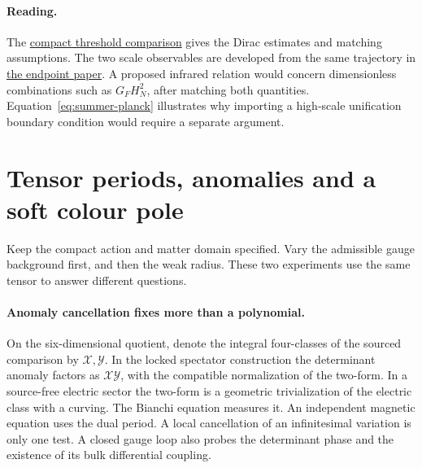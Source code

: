\documentclass[10pt]{article}
\theoremstyle{definition}
\begin{document}
\paragraph{Reading.} The \href{https://github.com/arivero/conneskk/blob/master/results/108_hopf_global_flux_and_anomaly_domain.md#colour-thresholds-at-the-compact-weak-fit}{compact threshold comparison} gives the Dirac estimates and matching assumptions. The two scale observables are developed from the same trajectory in \href{https://github.com/arivero/conneskk/blob/master/paper/two_endpoint_limits.tex}{the endpoint paper}. A proposed infrared relation would concern dimensionless combinations such as \(G_F H_N^2\), after matching both quantities. Equation~\eqref{eq:summer-planck} illustrates why importing a high-scale unification boundary condition would require a separate argument.

\section{Tensor periods, anomalies and a soft colour pole}

Keep the compact action and matter domain specified. Vary the admissible gauge background first, and then the weak radius. These two experiments use the same tensor to answer different questions.

\paragraph{Anomaly cancellation fixes more than a polynomial.}
On the six-dimensional quotient, denote the integral four-classes of the sourced comparison by \(\mathcal X,\mathcal Y\). In the locked spectator construction the determinant anomaly factors as \(\mathcal X\mathcal Y\), with the compatible normalization of the two-form. In a source-free electric sector the two-form is a geometric trivialization of the electric class with a curving. The Bianchi equation measures it. An independent magnetic equation uses the dual period. A local cancellation of an infinitesimal variation is only one test. A closed gauge loop also probes the determinant phase and the existence of its bulk differential coupling.
\end{document}
